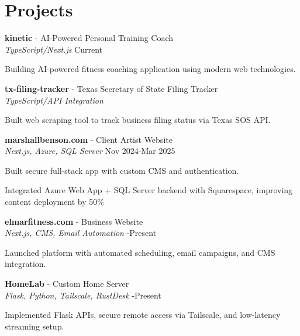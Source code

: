 \documentclass[letterpaper,10pt]{article}
\newcommand{\resumeItem}[1]{\item \small{#1}}
\begin{document}
\section*{Projects}
\begin{compactitem}
  \item[]
    \textbf{kinetic} - AI-Powered Personal Training Coach \\
    \textit{TypeScript/Next.js} \hbarfill Current
    \begin{compactitem}
      \resumeItem{Building AI-powered fitness coaching application using modern web technologies.}
    \end{compactitem}

  \item[]
    \textbf{tx-filing-tracker} - Texas Secretary of State Filing Tracker \\
    \textit{TypeScript/API Integration} 
    \begin{compactitem}
      \resumeItem{Built web scraping tool to track business filing status via Texas SOS API.}
    \end{compactitem}

  \item[]
    \textbf{marshallbenson.com} - Client Artist Website \\
    \textit{Next.js, Azure, SQL Server} \hbarfill Nov 2024-Mar 2025
    \begin{compactitem}
      \resumeItem{Built secure full-stack app with custom CMS and authentication.}
      \resumeItem{Integrated Azure Web App + SQL Server backend with Squarespace, improving content deployment by 50\%}
    \end{compactitem}

  \item[]
    \textbf{elmarfitness.com} - Business Website \\
    \textit{Next.js, CMS, Email Automation} -Present
    \begin{compactitem}
      \resumeItem{Launched platform with automated scheduling, email campaigns, and CMS integration.}
    \end{compactitem}

  \item[]
    \textbf{HomeLab} - Custom Home Server \\
    \textit{Flask, Python, Tailscale, RustDesk} -Present
    \begin{compactitem}
      \resumeItem{Implemented Flask APIs, secure remote access via Tailscale, and low-latency streaming setup.}
    \end{compactitem}
\end{compactitem}
\end{document}
